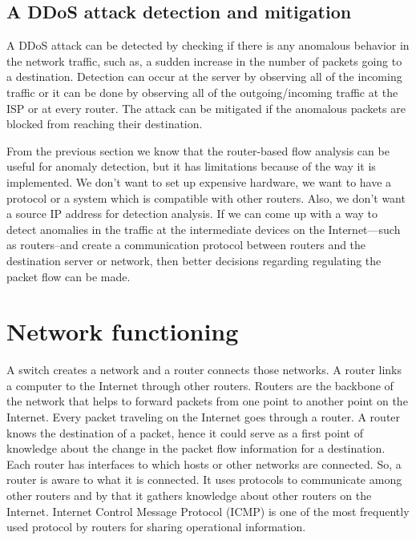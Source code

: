 \documentclass[12pt,oneside,a4paper]{article}
\begin{document}
\subsection{A DDoS attack detection and mitigation}

A DDoS attack can be detected by checking if there is any anomalous behavior in the network traffic, such as, a sudden increase in the number of packets going to a destination. Detection can occur at the server by observing all of the incoming traffic or it can be done by observing all of the outgoing/incoming traffic at the ISP or at every router. The attack can be mitigated if the anomalous packets are blocked from reaching their destination.

From the previous section we know that the router-based flow analysis can be useful for anomaly detection, but it has limitations because of the way it is implemented. We don't want to set up expensive hardware, we want to have a protocol or a system which is compatible with other routers. Also, we don't want a source IP address for detection analysis. If we can come up with a way to detect anomalies in the traffic at the intermediate devices on the Internet---such as routers--and create a communication protocol between routers and the destination server or network, then better decisions regarding regulating the packet flow can be made.

\pagebreak
\section{Network functioning}

A switch creates a network and a router connects those networks. A router links a computer to the Internet through other routers. Routers are the backbone of the network that helps to forward packets from one point to another point on the Internet. Every packet traveling on the Internet goes through a router\cite{router-switch}. A router knows the destination of a packet, hence it could serve as a first point of knowledge about the change in the packet flow information for a destination. Each router has interfaces to which hosts or other networks are connected. So, a router is aware to what it is connected. It uses protocols to communicate among other routers and by that it gathers knowledge about other routers on the Internet.  Internet Control Message Protocol (ICMP)\cite{icmp} is one of the most frequently used protocol by routers for sharing operational information.\par
\end{document}
